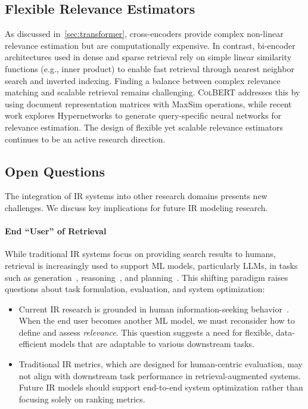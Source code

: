 \subsection{Flexible Relevance Estimators}
As discussed in~\cref{sec:transformer}, cross-encoders provide complex non-linear relevance estimation but are computationally expensive. In contrast, bi-encoder architectures used in dense and sparse retrieval rely on simple linear similarity functions (e.g., inner product) to enable fast retrieval through nearest neighbor search and inverted indexing. Finding a balance between complex relevance matching and scalable retrieval remains challenging. \textsc{ColBERT} \cite{khattab2020colbert} addresses this by using document representation matrices with MaxSim operations, while recent work \cite{killingback2025hypencoder} explores Hypernetworks \cite{ha2022hypernetworks} to generate query-specific neural networks for relevance estimation. The design of flexible yet scalable relevance estimators continues to be an active research direction.

\subsection{Open Questions}
The integration of IR systems into other research domains presents new challenges. We discuss key implications for future IR modeling research.

\paragraph{End ``User'' of Retrieval}
While traditional IR systems focus on providing search results to humans, retrieval is increasingly used to support ML models, particularly LLMs, in tasks such as generation~\cite{gao2023retrieval}, reasoning~\cite{yao2024mcqg,islam-etal-2024-open}, and planning~\cite{song2023llm}. This shifting paradigm raises questions about task formulation, evaluation, and system optimization:
\begin{itemize}[leftmargin=*]
    \item Current IR research is grounded in human information-seeking behavior~\cite{wilson2000human}. When the end user becomes another ML model, we must reconsider how to define and assess \textit{relevance}. This question suggests a need for flexible, data-efficient models that are adaptable to various downstream tasks.
    \item Traditional IR metrics, which are designed for human-centric evaluation, may not align with downstream task performance in retrieval-augmented systems. Future IR models should support end-to-end system optimization rather than focusing solely on ranking metrics. 
\end{itemize}

